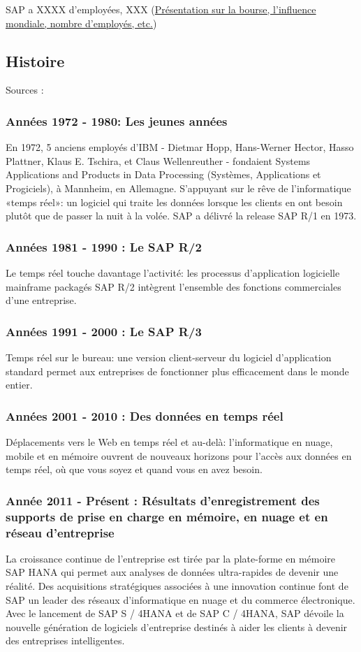 \documentclass[12pt]{article}
\begin{document}
    \par SAP a XXXX d'employées, XXX (\underline{Présentation sur la bourse, l'influence mondiale, nombre d'employés, etc.})
\subsection{Histoire}
Sources : \citet{SAP-History}
    \subsubsection{Années 1972 - 1980: Les jeunes années}
    En 1972, 5 anciens employés d'IBM - Dietmar Hopp, Hans-Werner Hector, Hasso Plattner, Klaus E. Tschira, et Claus Wellenreuther - fondaient Systems Applications and Products in Data Processing (Systèmes, Applications et Progiciels), à Mannheim, en Allemagne. S'appuyant sur le rêve de l'informatique «temps réel»: un logiciel qui traite les données lorsque les clients en ont besoin plutôt que de passer la nuit à la volée. SAP a délivré la release SAP R/1 en 1973.

    \subsubsection{Années 1981 - 1990 : Le SAP R/2}
    Le temps réel touche davantage l’activité: les processus d’application logicielle mainframe packagés SAP R/2 intègrent l’ensemble des fonctions commerciales d’une entreprise.

    \subsubsection{Années 1991 - 2000 : Le SAP R/3}
    Temps réel sur le bureau: une version client-serveur du logiciel d'application standard permet aux entreprises de fonctionner plus efficacement dans le monde entier.
    \subsubsection{Années 2001 - 2010 : Des données en temps réel}
    Déplacements vers le Web en temps réel et au-delà: l'informatique en nuage, mobile et en mémoire ouvrent de nouveaux horizons pour l'accès aux données en temps réel, où que vous soyez et quand vous en avez besoin.
    
    \subsubsection{Année 2011 - Présent : Résultats d'enregistrement des supports de prise en charge en mémoire, en nuage et en réseau d'entreprise}
    La croissance continue de l'entreprise est tirée par la plate-forme en mémoire SAP HANA qui permet aux analyses de données ultra-rapides de devenir une réalité. Des acquisitions stratégiques associées à une innovation continue font de SAP un leader des réseaux d’informatique en nuage et du commerce électronique. Avec le lancement de SAP S / 4HANA et de SAP C / 4HANA, SAP dévoile la nouvelle génération de logiciels d'entreprise destinés à aider les clients à devenir des entreprises intelligentes.
\end{document}
